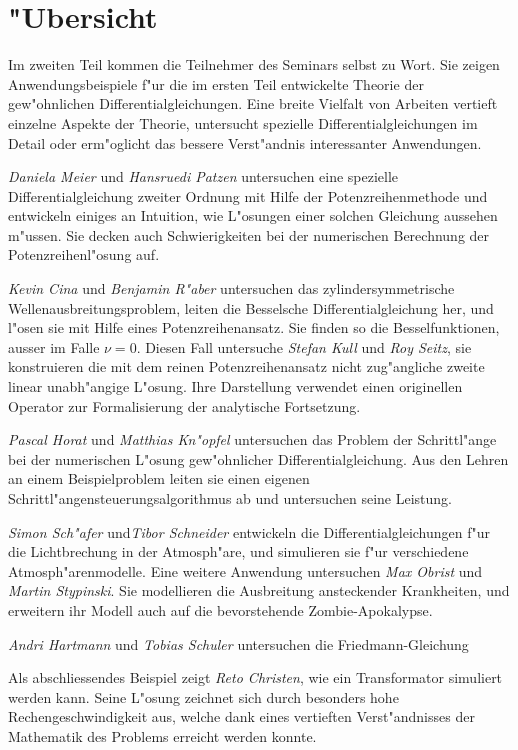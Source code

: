 %
%
%
\chapter*{"Ubersicht}
\rhead{}
\label{skript:uebersicht}
Im zweiten Teil kommen die Teilnehmer des Seminars selbst zu Wort.
Sie zeigen Anwendungsbeispiele f"ur die im ersten
Teil entwickelte Theorie der gew"ohnlichen Differentialgleichungen.
Eine breite Vielfalt von Arbeiten vertieft einzelne Aspekte der Theorie,
untersucht spezielle Differentialgleichungen im Detail
oder erm"oglicht das bessere Verst"andnis interessanter Anwendungen.

{\em Daniela Meier} und {\em Hansruedi Patzen} untersuchen eine spezielle
Differentialgleichung zweiter Ordnung mit Hilfe der Potenzreihenmethode
und entwickeln einiges an Intuition, wie L"osungen einer solchen Gleichung
aussehen m"ussen.
Sie decken auch Schwierigkeiten bei der numerischen Berechnung der
Potenzreihenl"osung auf.

{\em Kevin Cina} und {\em Benjamin R"aber} untersuchen das zylindersymmetrische
Wellenausbreitungsproblem, leiten die Besselsche Differentialgleichung
her, und l"osen sie mit Hilfe eines Potenzreihenansatz.
Sie finden so die Besselfunktionen, ausser im Falle $\nu =0$.
Diesen Fall untersuche {\em Stefan Kull} und {\em Roy Seitz}, sie konstruieren
die mit dem reinen Potenzreihenansatz nicht zug"angliche zweite linear
unabh"angige L"osung.
Ihre Darstellung verwendet einen originellen Operator zur Formalisierung
der analytische Fortsetzung.

{\em Pascal Horat} und {\em Matthias Kn"opfel} untersuchen das Problem
der Schrittl"ange bei der numerischen L"osung gew"ohnlicher
Differentialgleichung.
Aus den Lehren an einem Beispielproblem leiten sie einen eigenen
Schrittl"angensteuerungsalgorithmus ab und untersuchen seine Leistung.

{\em Simon Sch"afer} und{\em Tibor Schneider} entwickeln die
Differentialgleichungen f"ur die Lichtbrechung in der Atmosph"are, und
simulieren sie f"ur verschiedene Atmosph"arenmodelle.
Eine weitere Anwendung untersuchen {\em Max Obrist} und {\em Martin Stypinski}.
Sie modellieren die Ausbreitung ansteckender Krankheiten, und erweitern
ihr Modell auch auf die bevorstehende Zombie-Apokalypse.

{\em Andri Hartmann} und {\em Tobias Schuler} untersuchen die 
Friedmann-Gleichung

Als abschliessendes Beispiel zeigt {\em Reto Christen}, wie ein Transformator
simuliert werden kann. 
Seine L"osung zeichnet sich durch besonders hohe Rechengeschwindigkeit aus,
welche dank eines vertieften Verst"andnisses der Mathematik des Problems
erreicht werden konnte.











